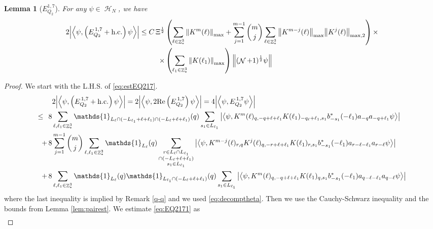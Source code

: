 \documentclass[sn-mathphys, Numbered ,a4paper]{sn-jnl}%
\DeclareMathOperator{\Z}{\mathbb{Z}}
\DeclareMathOperator{\HH}{\mathcal{H}}
\DeclareMathOperator{\NN}{\mathcal{N}}
\newcommand{\half}{\frac{1}{2}}
\newcommand{\eva}[1]{\left\langle #1 \right\rangle}
\theoremstyle{plain}
\newtheorem{lemma}[theorem]{Lemma}
\theoremstyle{definition}
\theoremstyle{remark}
\theoremstyle{plain}
\theoremstyle{definition}
\theoremstyle{remark}
\begin{document}
\begin{lemma}[$E_{Q_2}^{1,7}$]
	For any $\psi \in \HH_N$, we have
	\begin{align}
		2\abs{\eva{\psi,\left(E^{\,1,7}_{Q_2}+\mathrm{h.c.}\right) \psi }}
		\leq  C\, \Xi^\half &\left(\sum\limits_{\ell \in \Z^3_*} \norm{K^m(\ell)}_{\mathrm{max}} +\sum\limits_{j=1}^{m-1} {{m}\choose j} \sum\limits_{\ell \in \Z^3_*} \norm{K^{m-j}(\ell)}_{\mathrm{max}} \norm{ K^{j}(\ell)}_{\mathrm{max},2}\right)\nonumber \times\\ \times&\left( \sum\limits_{\ell_1\in \Z^3_*} \norm{ K(\ell_1)}_{\mathrm{max}} \right) \norm{(\NN+1)^\half\psi}  \label{eq:estEQ217}
	\end{align}
\end{lemma}
\begin{proof}
 We start with the L.H.S. of \eqref{eq:estEQ217}.
\begin{align}
	&2\abs{\eva{\psi,\left(E^{\,1,7}_{Q_2}+\mathrm{h.c.}\right) \psi }} =2 \abs{\eva{\psi,2\mathrm{Re}\left(E^{\,1,7}_{Q_2}\right) \psi }} = 4\abs{\eva{\psi, E^{\,1,7}_{Q_2} \psi }}\nonumber\\
	\leq\,\;8& \sum\limits_{\ell, \ell_1\in \Z^3_*} \mathds{1}_{L_{\ell} \cap (-L_{\ell_1}+\ell+\ell_1) \cap (-L_{\ell}+\ell+\ell_1)}(q) \sum\limits_{s_1 \in L_{\ell_1}} \abs{\eva{\psi, K^m(\ell)_{q,-q+\ell+\ell_1} K(\ell_1)_{-q_\ell+\ell_1,s_1} b^*_{-s_1}(-\ell_1) a_{-q} a_{-q+\ell_1} \psi}} \label{eq:EQ2171}\\
	+\,8& \sum\limits_{j=1}^{m-1} {{m}\choose j} \sum\limits_{\ell, \ell_1\in \Z^3_*}\mathds{1}_{L_{\ell}}(q) \sum\limits_{\substack{r\in L_{\ell} \cap L_{\ell_1} \\ \cap (-L_{\ell}+\ell+\ell_1)\\s_1\in L_{\ell_1}}}  \abs{\eva{\psi, K^{m-j}(\ell)_{r,q} K^j(\ell)_{q,-r+\ell+\ell_1} K(\ell_1)_{r,s_1} b^*_{-s_1}(-\ell_1)a_{r-\ell-\ell_1}a_{r-\ell} \psi }} \label{eq:EQ2172}\\
	+\,8&\sum\limits_{\ell, \ell_1\in \Z^3_*} \mathds{1}_{L_{\ell}}(q) \mathds{1}_{L_{\ell_1}\cap (-L_{\ell}+\ell+\ell_1)}(q) \sum\limits_{s_1\in L_{\ell_1}} \abs{\eva{\psi, K^m(\ell)_{q,-q+\ell+\ell_1} K(\ell_1)_{q,s_1} b^*_{-s_1}(-\ell_1)a_{q-\ell-\ell_1}a_{q-\ell} \psi }} \label{eq:EQ2173}
\end{align}
where the last inequality is implied by Remark \ref{q-q} and we used \eqref{eq:decomptheta}.
Then we use the Cauchy-Schwarz inequality and the bounds from Lemma \ref{lem:pairest}.
We estimate \eqref{eq:EQ2171} as 
\begin{align}

\end{align}
\end{proof}
\end{document}
